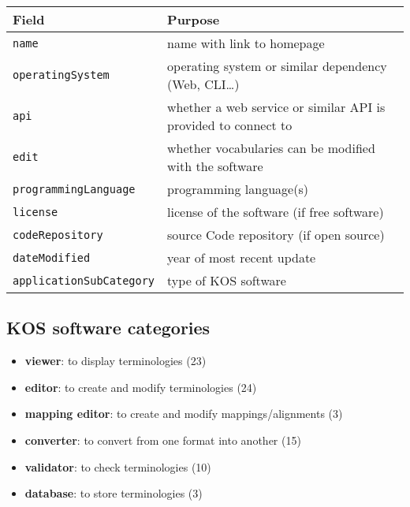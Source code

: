 \documentclass[
  DIV=10]{article}
\providecommand{\tightlist}{%
  \setlength{\itemsep}{0pt}\setlength{\parskip}{0pt}}
\begin{document}
\begin{longtable}[]{@{}
  >{\raggedright\arraybackslash}p{}
  >{\raggedright\arraybackslash}p{}@{}}
\toprule\noalign{}
\begin{minipage}[b]{\linewidth}\raggedright
Field
\end{minipage} & \begin{minipage}[b]{\linewidth}\raggedright
Purpose
\end{minipage} \\
\midrule\noalign{}
\endhead
\bottomrule\noalign{}
\endlastfoot
\texttt{name} & name with link to homepage \\
\texttt{operatingSystem} & operating system or similar dependency (Web,
CLI\ldots) \\
\texttt{api} & whether a web service or similar API is provided to
connect to \\
\texttt{edit} & whether vocabularies can be modified with the
software \\
\texttt{programmingLanguage} & programming language(s) \\
\texttt{license} & license of the software (if free software) \\
\texttt{codeRepository} & source Code repository (if open source) \\
\texttt{dateModified} & year of most recent update \\
\texttt{applicationSubCategory} & type of KOS software \\
\end{longtable}

\subsection{KOS software categories}\label{kos-software-categories}

\begin{itemize}
\tightlist
\item
  \textbf{viewer}: to display terminologies (23)
\item
  \textbf{editor}: to create and modify terminologies (24)
\item
  \textbf{mapping editor}: to create and modify mappings/alignments (3)
\item
  \textbf{converter}: to convert from one format into another (15)
\item
  \textbf{validator}: to check terminologies (10)
\item
  \textbf{database}: to store terminologies (3)
\end{itemize}
\end{document}
